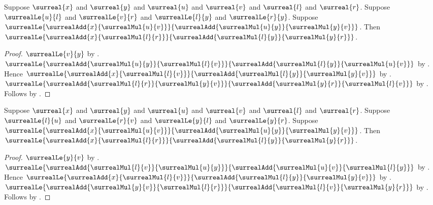 \begin{lemma}\label{surreal_sqrt_refine_lower_interpolation}
    Suppose $\surreal{x}$ and $\surreal{y}$ and
        $\surreal{u}$ and $\surreal{v}$ and
        $\surreal{l}$ and $\surreal{r}$.
    Suppose $\surrealLe{u}{l}$ and $\surrealLe{v}{r}$ and
        $\surrealLe{l}{y}$ and $\surrealLe{r}{y}$.
    Suppose
        $\surrealLe{
            \surrealAdd{x}{\surrealMul{u}{v}}}{
            \surrealAdd{\surrealMul{u}{y}}{\surrealMul{y}{v}}}$.
    Then
        $\surrealLe{
            \surrealAdd{x}{\surrealMul{l}{r}}}{
            \surrealAdd{\surrealMul{l}{y}}{\surrealMul{y}{r}}}$.
\end{lemma}
\begin{proof}
    $\surrealLe{v}{y}$
        by .
    $\surrealLe{
        \surrealAdd{\surrealMul{u}{y}}{\surrealMul{l}{v}}}{
        \surrealAdd{\surrealMul{l}{y}}{\surrealMul{u}{v}}}$
        by .
    Hence
        $\surrealLe{
            \surrealAdd{x}{\surrealMul{l}{v}}}{
            \surrealAdd{\surrealMul{l}{y}}{\surrealMul{y}{v}}}$
        by .
    $\surrealLe{
        \surrealAdd{\surrealMul{l}{r}}{\surrealMul{y}{v}}}{
        \surrealAdd{\surrealMul{y}{r}}{\surrealMul{l}{v}}}$
        by .
    Follows by
        .
\end{proof}

\begin{lemma}\label{surreal_sqrt_refine_upper_interpolation}
    Suppose $\surreal{x}$ and $\surreal{y}$ and
        $\surreal{u}$ and $\surreal{v}$ and
        $\surreal{l}$ and $\surreal{r}$.
    Suppose $\surrealLe{l}{u}$ and $\surrealLe{r}{v}$ and
        $\surrealLe{y}{l}$ and $\surrealLe{y}{r}$.
    Suppose
        $\surrealLe{
            \surrealAdd{x}{\surrealMul{u}{v}}}{
            \surrealAdd{\surrealMul{u}{y}}{\surrealMul{y}{v}}}$.
    Then
        $\surrealLe{
            \surrealAdd{x}{\surrealMul{l}{r}}}{
            \surrealAdd{\surrealMul{l}{y}}{\surrealMul{y}{r}}}$.
\end{lemma}
\begin{proof}
    $\surrealLe{y}{v}$
        by .
    $\surrealLe{
        \surrealAdd{\surrealMul{l}{v}}{\surrealMul{u}{y}}}{
        \surrealAdd{\surrealMul{u}{v}}{\surrealMul{l}{y}}}$
        by .
    Hence
        $\surrealLe{
            \surrealAdd{x}{\surrealMul{l}{v}}}{
            \surrealAdd{\surrealMul{l}{y}}{\surrealMul{y}{v}}}$
        by .
    $\surrealLe{
        \surrealAdd{\surrealMul{y}{v}}{\surrealMul{l}{r}}}{
        \surrealAdd{\surrealMul{l}{v}}{\surrealMul{y}{r}}}$
        by .
    Follows by
        .
\end{proof}

